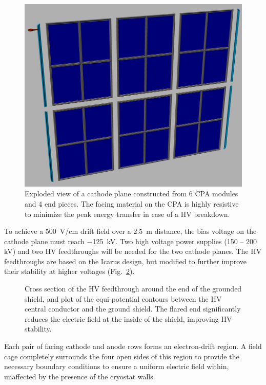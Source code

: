 \begin{figure}[t]
\centering
\includegraphics[width=5in]{figures/TPC_CPA_1}
\caption{Exploded view of a cathode plane constructed from 6 CPA modules and 4 end pieces. The facing material on the CPA is highly resistive to minimize the peak energy transfer in case of a HV breakdown.}
\label{fig:tpc_cpa_1}
\end{figure}

To achieve a 500~V/cm drift field over a 2.5~m distance, the bias 
voltage on the cathode plane must reach $-$125~kV. Two high voltage power supplies (150 -- 200 kV) and two HV feedthroughs will be needed for the two cathode planes.  The HV feedthroughs are based on the Icarus design, but modified to further improve their stability at higher voltages (Fig.~\ref{fig:tpc_hv_ft}).

\begin{figure}[hb]
\centering
\caption{Cross section of the HV feedthrough around the end of the grounded shield, and plot of the equi-potential contours between the HV central conductor and the ground shield. The flared end significantly reduces the electric field at the inside of the shield, improving HV stability.}
\label{fig:tpc_hv_ft}
\end{figure}



Each pair of facing cathode and anode rows forms an electron-drift region. 
A field cage  completely surrounds the four open sides of this region
to provide the necessary boundary conditions to ensure a uniform electric field within, unaffected by the presence of the cryostat walls.

